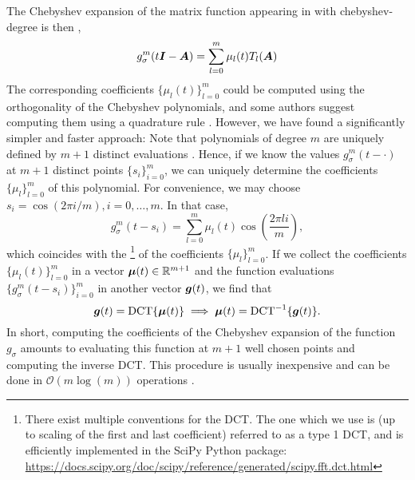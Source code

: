 The Chebyshev expansion of the matrix function appearing in 
with \gls{chebyshev-degree} is then \cite[Chapter~3]{trefethen2019chebyshev},
\begin{equation}
    g_{\sigma}^m(t\boldsymbol{I} - \boldsymbol{A}) = \sum_{l=0}^m \mu_l(t) T_l(\boldsymbol{A})
    \label{equ:2-chebyshev-chebyshev-expansion}
\end{equation}
The corresponding coefficients $\{\mu_l(t)\}_{l=0}^m$ could be computed using the
orthogonality of the Chebyshev polynomials, and some authors suggest computing
them using a quadrature rule \cite[Algorithm~1]{lin2017randomized}. However, we
have found a significantly simpler and faster approach: Note that polynomials of
degree $m$ are uniquely defined by $m+1$ distinct evaluations \cite{gauss1799demonstratio}.
Hence, if we know the values $g_{\sigma}^m(t - \cdot)$ at $m+1$ distinct points 
$\{s_i\}_{i=0}^m$, we can uniquely determine the coefficients $\{\mu_l\}_{l=0}^m$
of this polynomial. For convenience, we may choose $s_i = \cos(2 \pi i/m), i=0,\dots,m$.
In that case,
\begin{equation}
    g_{\sigma}^m(t - s_i) = \sum_{l=0}^{m} \mu_l(t) \cos\left(\frac{2 \pi l i}{m}\right),
    \label{equ:2-chebyshev-chebyshev-nodes-evaluation}
\end{equation}
which coincides with the \footnote{There exist multiple conventions for the DCT.
The one which we use is (up to scaling of the first and last coefficient)
referred to as a type 1 DCT, and is efficiently implemented in the SciPy Python package:
\url{https://docs.scipy.org/doc/scipy/reference/generated/scipy.fft.dct.html}} of the coefficients $\{\mu_l\}_{l=0}^m$.
If we collect the coefficients $\{\mu_l(t)\}_{l=0}^{m}$ in a vector $\boldsymbol{\mu}(t) \in \mathbb{R}^{m+1}$ 
and the function evaluations $\{g_{\sigma}^m(t - s_i)\}_{i=0}^{m}$ in another
vector $\boldsymbol{g}(t)$, we find that
\begin{equation}
    \boldsymbol{g}(t) = \operatorname{DCT} \{ \boldsymbol{\mu}(t) \} \implies \boldsymbol{\mu}(t) = \operatorname{DCT}^{-1}\{ \boldsymbol{g}(t) \}.
    \label{equ:2-chebyshev-chebyshev-DCT}
\end{equation}
In short, computing the coefficients of the Chebyshev expansion 
of the function $g_{\sigma}$ amounts to evaluating this function at $m+1$ well
chosen points and computing the inverse \gls{DCT}.
This procedure is usually inexpensive and can be done in $\mathcal{O}(m \log(m))$
operations \cite{makhoul1980fct}.\\

